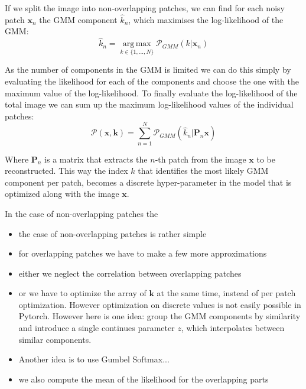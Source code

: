 \documentclass[twocolumn]{aastex631}
\DeclareMathOperator*{\argmax}{arg\,max}
\begin{document}
    If we split the image into non-overlapping patches, we can find for each noisy patch $\mathbf{x}_n$ the GMM component $\hat{k}_n$, which maximises the log-likelihood of the GMM:
    \begin{equation}
        \hat{k}_n = \underset{k \in \{1, ..., N\} }{\argmax}{\mathcal{P}_{GMM}(k| \mathbf{x}_n)}
    \end{equation}
    \vspace{0.2em}

    As the number of components in the GMM is limited we can do this simply by evaluating the likelihood for each of the components and choose the one with the maximum value of the log-likelihood. To finally evaluate the log-likelihood of the total image we can sum up the maximum log-likelihood values of the individual patches: 
    \begin{equation}
        \mathcal{P}(\mathbf{x}, \mathbf{k}) = \sum_{n = 1}^N \mathcal{P}_{GMM}(\hat{k}_n | \mathbf{P}_n \mathbf{x})
    \end{equation}

    Where $\mathbf{P}_n$ is a matrix that extracts the $n$-th patch
    from the image $\mathbf{x}$ to be reconstructed. This way the index $k$ that identifies the most likely GMM component per patch, becomes a discrete hyper-parameter in the model that is optimized along with the image $\mathbf{x}$. 
    
    In the case of non-overlapping patches the 
    
    \begin{itemize}
        \item the case of non-overlapping patches is rather simple
        \item for overlapping patches we have to make a few more approximations
        \item either we neglect the correlation between overlapping patches
        \item or we have to optimize the array of $\mathbf{k}$ at the same time, instead of per patch optimization. However optimization on discrete 
        values is not easily possible in Pytorch. However here is one idea:
        group the GMM components by similarity and introduce a single continues
        parameter $z$, which interpolates between similar components.
        \item Another idea is to use Gumbel Softmax...
        \item we also compute the mean of the likelihood for the overlapping parts
    \end{itemize}
\end{document}
